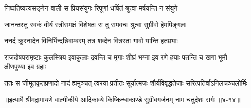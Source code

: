 \twolineshloka
{निष्पतिष्यत्यसङ्गेन वाली स प्रियसंयुगः}
{रिपूणां धर्षितं श्रुत्वा मर्षयन्ति न संयुगे} %

\twolineshloka
{जानन्तस्तु स्वकं वीर्यं स्त्रीसमक्षं विशेषतः}
{स तु रामवचः श्रुत्वा सुग्रीवो हेमपिङ्गलः} %

\twolineshloka
{ननर्द क्रूरनादेन विनिर्भिन्दन्निवाम्बरम्}
{तत्र शब्देन वित्रस्ता गावो यान्ति हतप्रभाः} %

\threelineshloka
{राजदोषपरामृष्टाः कुलस्त्रिय इवाकुलाः}
{द्रवन्ति च मृगाः शीघ्रं भग्ना इव रणे हयाः}
{पतन्ति च खगा भूमौ क्षीणपुण्या इव ग्रहाः} %

\twolineshloka
{ततः स जीमूतकृतप्रणादो नादं ह्यमुञ्चत् त्वरया प्रतीतः}
{सूर्यात्मजः शौर्यविवृद्धतेजाः सरित्पतिर्वाऽनिलचञ्चलोर्मिः} %


॥इत्यार्षे श्रीमद्रामायणे वाल्मीकीये आदिकाव्ये किष्किन्धाकाण्डे सुग्रीवगर्जनम् नाम चतुर्दशः सर्गः ॥४-१४॥

